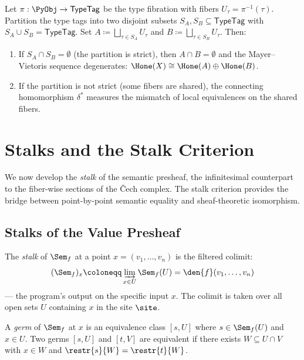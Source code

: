 \begin{proposition}
\label{prop:mv-fibration}
Let $\pi : \PyObj \to \mathsf{TypeTag}$ be the type fibration with
fibers $U_\tau = \pi^{-1}(\tau)$.  Partition the type tags into two
disjoint subsets $S_A, S_B \subseteq \mathsf{TypeTag}$ with
$S_A \cup S_B = \mathsf{TypeTag}$.  Set
$A \coloneqq \bigsqcup_{\tau \in S_A} U_\tau$ and
$B \coloneqq \bigsqcup_{\tau \in S_B} U_\tau$.  Then:
\begin{enumerate}
  \item If $S_A \cap S_B = \emptyset$ (the partition is strict), then
    $A \cap B = \emptyset$ and the Mayer--Vietoris sequence degenerates:
    $\Hone(X) \cong \Hone(A) \oplus \Hone(B)$.
  \item If the partition is not strict (some fibers are shared), the
    connecting homomorphism $\delta^*$ measures the mismatch of local
    equivalences on the shared fibers.
\end{enumerate}
\end{proposition}


\chapter{Stalks and the Stalk Criterion}
\label{ch:stalks}

We now develop the \emph{stalk} of the semantic presheaf, the
infinitesimal counterpart to the fiber-wise sections of the \v{C}ech
complex.  The stalk criterion provides the bridge between
point-by-point semantic equality and sheaf-theoretic isomorphism.

\section{Stalks of the Value Presheaf}

\begin{definition}[Stalk]
\label{def:stalk}
The \emph{stalk} of $\Sem_f$ at a point $x = (v_1, \ldots, v_n)$ is
the filtered colimit:
\[
  (\Sem_f)_x \coloneqq \varinjlim_{x \in U} \Sem_f(U) = \den{f}(v_1, \ldots, v_n)
\]
--- the program's output on the specific input $x$.  The colimit is
taken over all open sets $U$ containing $x$ in the site $\site$.
\end{definition}

\begin{definition}[Germ]
\label{def:germ}
A \emph{germ} of $\Sem_f$ at $x$ is an equivalence class $[s, U]$ where
$s \in \Sem_f(U)$ and $x \in U$.  Two germs $[s, U]$ and $[t, V]$
are equivalent if there exists $W \subseteq U \cap V$ with $x \in W$
and $\restr{s}{W} = \restr{t}{W}$.
\end{definition}

